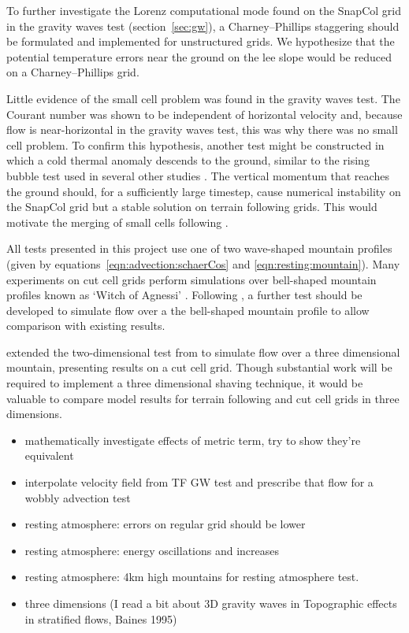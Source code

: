 
To further investigate the Lorenz computational mode found on the SnapCol grid in the gravity waves test (section~\ref{sec:gw}), a Charney--Phillips staggering should be formulated and implemented for unstructured grids.  We hypothesize that the potential temperature errors near the ground on the lee slope would be reduced on a Charney--Phillips grid.


Little evidence of the small cell problem was found in the gravity waves test.  The Courant number was shown to be independent of horizontal velocity and, because flow is near-horizontal in the gravity waves test, this was why there was no small cell problem.  To confirm this hypothesis, another test might be constructed in which a cold thermal anomaly descends to the ground, similar to the rising bubble test used in several other studies \parencites{bonaventura2000}{jebens2011}{good2013}.  The vertical momentum that reaches the ground should, for a sufficiently large timestep, cause numerical instability on the SnapCol grid but a stable solution on terrain following grids.  This would motivate the merging of small cells following \textcite{yamazaki-satomura2010}.


All tests presented in this project use one of two wave-shaped mountain profiles (given by equations~\ref{eqn:advection:schaerCos} and \ref{eqn:resting:mountain}).  Many experiments on cut cell grids perform simulations over bell-shaped mountain profiles known as `Witch of Agnessi' \parencites{steppeler2002}{rosatti2005}{jebens2011}{lock2012}.  Following \textcite{gallus-klemp2000}, a further test should be developed to simulate flow over a the bell-shaped mountain profile to allow comparison with existing results.

\textcite{lock2012} extended the two-dimensional test from \textcite{gallus-klemp2000} to simulate flow over a three dimensional mountain, presenting results on a cut cell grid.  Though substantial work will be required to implement a three dimensional shaving technique, it would be valuable to compare model results for terrain following and cut cell grids in three dimensions.

\begin{itemize}
\item mathematically investigate effects of metric term, try to show they're equivalent
\item interpolate velocity field from TF GW test and prescribe that flow for a wobbly advection test
\item resting atmosphere: errors on regular grid should be lower
\item resting atmosphere: energy oscillations and increases
\item resting atmosphere: 4km high mountains for resting atmosphere test.
\item three dimensions (I read a bit about 3D gravity waves in Topographic effects in stratified flows, Baines 1995) 
\end{itemize}
